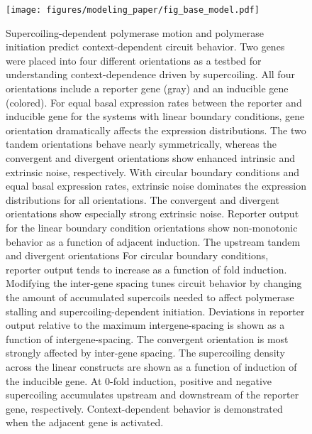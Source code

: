 \documentclass[11pt]{article}
\begin{document}
\begin{figure}[h]
    \centering
    {\texttt{[image: figures/modeling\_paper/fig\_base\_model.pdf]}
    \label{fig:base_orientations}
    \label{fig:linear_bc_distributions}
    \label{fig:circular_bc_distributions}
    \label{fig:linear_fold_induction}
    \label{fig:circular_fold_induction}
    \label{fig:intergene_spacing_cartoon}
    \label{fig:reporter_output_by_spacing_fold_induction}}
    \label{fig:base_model_sc_density}
\end{figure}
\begin{figure}
    \ContinuedFloat
    \caption{Supercoiling-dependent polymerase motion and polymerase initiation predict context-dependent circuit behavior.
         Two genes were placed into four different orientations as a testbed for understanding context-dependence driven by supercoiling. All four orientations include a reporter gene (gray) and an inducible gene (colored).
         For equal basal expression rates between the reporter and inducible gene for the systems with linear boundary conditions, gene orientation dramatically affects the expression distributions. The two tandem orientations behave nearly symmetrically, whereas the convergent and divergent orientations show enhanced intrinsic and extrinsic noise, respectively.
         With circular boundary conditions and equal basal expression rates, extrinsic noise dominates the expression distributions for all orientations. The convergent and divergent orientations show especially strong extrinsic noise.
         Reporter output for the linear boundary condition orientations show non-monotonic behavior as a function of adjacent induction. The upstream tandem and divergent orientations
         For circular boundary conditions, reporter output tends to increase as a function of fold induction.
         Modifying the inter-gene spacing tunes circuit behavior by changing the amount of accumulated supercoils needed to affect polymerase stalling and supercoiling-dependent initiation.
         Deviations in reporter output relative to the maximum intergene-spacing is shown as a function of intergene-spacing. The convergent orientation is most strongly affected by inter-gene spacing.
         The supercoiling density across the linear constructs are shown as a function of induction of the inducible gene. At 0-fold induction, positive and negative supercoiling accumulates upstream and downstream of the reporter gene, respectively. Context-dependent behavior is demonstrated when the adjacent gene is activated.
    } \label{fig:top:orientation_bc_behavior}
\end{figure}
\end{document}
